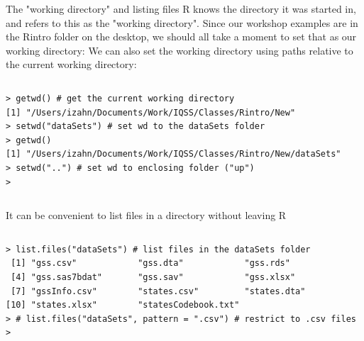 \documentclass[table,smaller]{beamer}
\begin{document}
\begin{frame}[fragile,label=sec-4-2]{The "working directory" and listing files}
  R knows the directory it was started in, and refers to this as the "working directory". Since our workshop examples are in the Rintro folder on the desktop, we should all take a moment to set that as our working directory:
We can also set the working directory using paths relative to the current working directory:

\vspace{-.5em}
\begin{columns}
\begin{block}{}
\begin{verbatim}
> getwd() # get the current working directory
[1] "/Users/izahn/Documents/Work/IQSS/Classes/Rintro/New"
> setwd("dataSets") # set wd to the dataSets folder
> getwd()
[1] "/Users/izahn/Documents/Work/IQSS/Classes/Rintro/New/dataSets"
> setwd("..") # set wd to enclosing folder ("up")
>
\end{verbatim}
\end{block}
\end{columns}
\vspace{.5em}

It can be convenient to list files in a directory without leaving R
\vspace{-.5em}
\begin{columns}
\begin{block}{}
\begin{verbatim}
> list.files("dataSets") # list files in the dataSets folder
 [1] "gss.csv"            "gss.dta"            "gss.rds"           
 [4] "gss.sas7bdat"       "gss.sav"            "gss.xlsx"          
 [7] "gssInfo.csv"        "states.csv"         "states.dta"        
[10] "states.xlsx"        "statesCodebook.txt"
> # list.files("dataSets", pattern = ".csv") # restrict to .csv files  
>
\end{verbatim}
\end{block}
\end{columns}
\vspace{.5em}
\end{frame}
\end{document}
